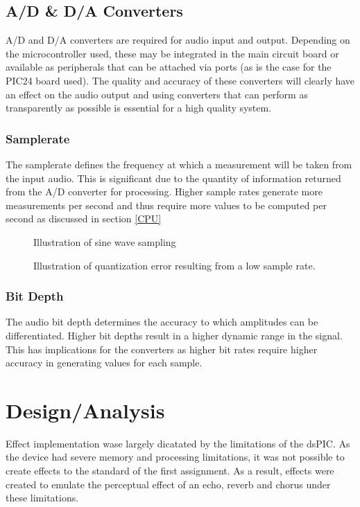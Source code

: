 \documentclass[titlepage]{scrartcl}
\begin{document}
    \subsection{A/D \& D/A Converters}
    A/D and D/A converters are required for audio input and output. Depending
    on the microcontroller used, these may be integrated in the main circuit
    board or available as peripherals that can be attached via ports (as is the
    case for the PIC24 board used). The quality and accuracy of these
    converters will clearly have an effect on the audio output and using
    converters that can perform as transparently as possible is essential for a
    high quality system.~\parencite[p.147-152]{kadis2012sosr}
    
    \subsubsection{Samplerate}
    The samplerate defines the frequency at which a measurement will be taken
    from the input audio. This is significant due to the quantity of
    information returned from the A/D converter for processing. Higher sample
    rates generate more measurements per second and thus require more values
    to be computed per second as discussed in section \ref{CPU}
    \begin{figure}[H]
        \caption{Illustration of sine wave sampling}
    \end{figure}
    \begin{figure}[H]
        \caption{Illustration of quantization error resulting from a low sample
        rate.}
    \end{figure}

    \subsubsection{Bit Depth}
    The audio bit depth determines the accuracy to which amplitudes can be
    differentiated. Higher bit depths result in a higher dynamic range in the
    signal. This has implications for the converters as higher bit rates
    require higher accuracy in generating values for each sample.~\parencite[p.143-145]{kadis2012sosr}

    \section{Design/Analysis}\label{design}
    Effect implementation wase largely dicatated by the limitations of the
    dsPIC. As the device had severe memory and processing limitations, it was
    not possible to create effects to the standard of the first assignment. As
    a result, effects were created to emulate the perceptual effect of an echo,
    reverb and chorus under these limitations.
\end{document}
